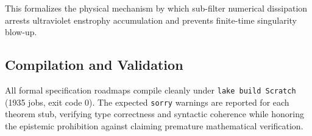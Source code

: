 This formalizes the physical mechanism by which sub-filter numerical dissipation arrests ultraviolet enstrophy accumulation and prevents finite-time singularity blow-up.

\subsection{Compilation and Validation}

All formal specification roadmaps compile cleanly under \texttt{lake build Scratch} (1935 jobs, exit code 0). The expected \texttt{sorry} warnings are reported for each theorem stub, verifying type correctness and syntactic coherence while honoring the epistemic prohibition against claiming premature mathematical verification.

